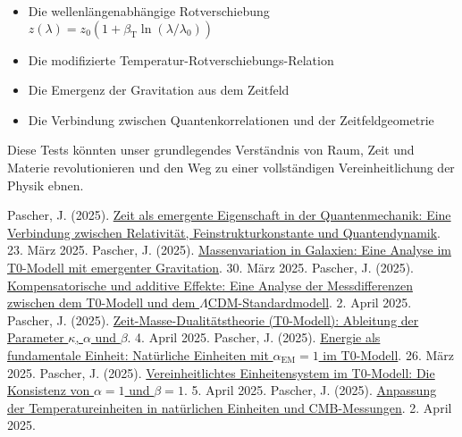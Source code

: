 \documentclass[12pt,a4paper]{article}
\newcommand{\betaT}{\beta_{\text{T}}}
\newcommand{\alphaEM}{\alpha_{\text{EM}}}
\begin{document}
	\begin{itemize}
		\item Die wellenlängenabhängige Rotverschiebung \(z(\lambda) = z_0 (1 + \betaT \ln(\lambda/\lambda_0))\)
		\item Die modifizierte Temperatur-Rotverschiebungs-Relation
		\item Die Emergenz der Gravitation aus dem Zeitfeld
		\item Die Verbindung zwischen Quantenkorrelationen und der Zeitfeldgeometrie
	\end{itemize}
	
	Diese Tests könnten unser grundlegendes Verständnis von Raum, Zeit und Materie revolutionieren und den Weg zu einer vollständigen Vereinheitlichung der Physik ebnen.
	
	\begin{thebibliography}{99}
		 Pascher, J. (2025). \href{https://github.com/jpascher/T0-Time-Mass-Duality/tree/main/2/pdf/Deutsch/NatEinheitenAlpha1.pdf}{Zeit als emergente Eigenschaft in der Quantenmechanik: Eine Verbindung zwischen Relativität, Feinstrukturkonstante und Quantendynamik}. 23. März 2025.
		 Pascher, J. (2025). \href{https://github.com/jpascher/T0-Time-Mass-Duality/tree/main/2/pdf/Deutsch/MassVarGalaxien.pdf}{Massenvariation in Galaxien: Eine Analyse im T0-Modell mit emergenter Gravitation}. 30. März 2025.
		 Pascher, J. (2025). \href{https://github.com/jpascher/T0-Time-Mass-Duality/tree/main/2/pdf/Deutsch/MessdifferenzenT0Standard.pdf}{Kompensatorische und additive Effekte: Eine Analyse der Messdifferenzen zwischen dem T0-Modell und dem \(\Lambda\)CDM-Standardmodell}. 2. April 2025.
		 Pascher, J. (2025). \href{https://github.com/jpascher/T0-Time-Mass-Duality/tree/main/2/pdf/Deutsch/ZeitMasseT0Params.pdf}{Zeit-Masse-Dualitätstheorie (T0-Modell): Ableitung der Parameter \(\kappa\), \(\alpha\) und \(\beta\)}. 4. April 2025.
		 Pascher, J. (2025). \href{https://github.com/jpascher/T0-Time-Mass-Duality/tree/main/2/pdf/Deutsch/NatEinheitenAlpha1.pdf}{Energie als fundamentale Einheit: Natürliche Einheiten mit \(\alphaEM = 1\) im T0-Modell}. 26. März 2025.
		 Pascher, J. (2025). \href{https://github.com/jpascher/T0-Time-Mass-Duality/tree/main/2/pdf/Deutsch/Alpha1Beta1Konsistenz.pdf}{Vereinheitlichtes Einheitensystem im T0-Modell: Die Konsistenz von \(\alpha = 1\) und \(\beta = 1\)}. 5. April 2025.
		 Pascher, J. (2025). \href{https://github.com/jpascher/T0-Time-Mass-Duality/tree/main/2/pdf/Deutsch/NatEinheitenAlpha1.pdf}{Anpassung der Temperatureinheiten in natürlichen Einheiten und CMB-Messungen}. 2. April 2025.

\end{thebibliography}
\end{document}
